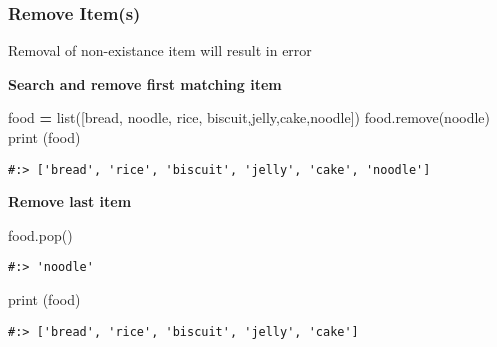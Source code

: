 \documentclass[
]{book}
\newenvironment{Shaded}{\begin{snugshade}}{\end{snugshade}}
\newcommand{\BuiltInTok}[1]{#1}
\newcommand{\NormalTok}[1]{#1}
\newcommand{\OperatorTok}[1]{\textcolor[rgb]{0.43,0.43,0.43}{\textbf{#1}}}
\newcommand{\StringTok}[1]{\textcolor[rgb]{0.5,0.5,0.5}{#1}}
\begin{document}
\hypertarget{remove-items}{%
\subsubsection{Remove Item(s)}\label{remove-items}}

Removal of non-existance item will result in error

\textbf{Search and remove first matching item}

\begin{Shaded}
\begin{Highlighting}[]
\NormalTok{food }\OperatorTok{=} \BuiltInTok{list}\NormalTok{([}\StringTok{\textquotesingle{}bread\textquotesingle{}}\NormalTok{, }\StringTok{\textquotesingle{}noodle\textquotesingle{}}\NormalTok{, }\StringTok{\textquotesingle{}rice\textquotesingle{}}\NormalTok{, }\StringTok{\textquotesingle{}biscuit\textquotesingle{}}\NormalTok{,}\StringTok{\textquotesingle{}jelly\textquotesingle{}}\NormalTok{,}\StringTok{\textquotesingle{}cake\textquotesingle{}}\NormalTok{,}\StringTok{\textquotesingle{}noodle\textquotesingle{}}\NormalTok{])}
\NormalTok{food.remove(}\StringTok{\textquotesingle{}noodle\textquotesingle{}}\NormalTok{)}
\BuiltInTok{print}\NormalTok{ (food)}
\end{Highlighting}
\end{Shaded}

\begin{verbatim}
#:> ['bread', 'rice', 'biscuit', 'jelly', 'cake', 'noodle']
\end{verbatim}

\textbf{Remove last item}

\begin{Shaded}
\begin{Highlighting}[]
\NormalTok{food.pop()}
\end{Highlighting}
\end{Shaded}

\begin{verbatim}
#:> 'noodle'
\end{verbatim}

\begin{Shaded}
\begin{Highlighting}[]
\BuiltInTok{print}\NormalTok{ (food)}
\end{Highlighting}
\end{Shaded}

\begin{verbatim}
#:> ['bread', 'rice', 'biscuit', 'jelly', 'cake']
\end{verbatim}
\end{document}
